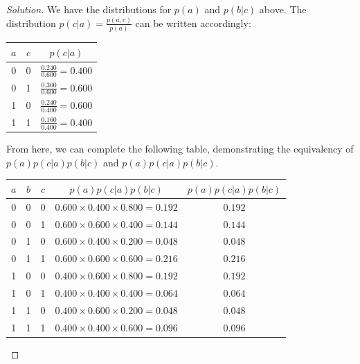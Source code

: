 \documentclass[11pt, oneside]{article}\usepackage[]{graphicx}\usepackage[]{color}
\newenvironment{solution}
  {\begin{proof}[Solution]}
  {\end{proof}}
\begin{document}
\begin{solution}\mbox{} \newline

We have the distributions for $p(a)$ and $p(b|c)$ above. The distribution $p(c|a) = \frac{p(a, c)}{p(a)}$ can be written accordingly:

\begin{table}[h]
\centering
\begin{tabular}{|c|c|c|}
\hline
$a$ & $c$ & $p(c|a)$ \\
\hline
0 & 0 & $\frac{0.240}{0.600} = 0.400$ \\
0 & 1 & $\frac{0.360}{0.600} = 0.600$ \\
1 & 0 & $\frac{0.240}{0.400} = 0.600$ \\
1 & 1 & $\frac{0.160}{0.400} = 0.400$ \\
\hline
\end{tabular}
\end{table}

From here, we can complete the following table, demonstrating the equivalency of $p(a)p(c|a)p(b|c)$ and $p(a)p(c|a)p(b|c)$.

\begin{table}[h]
\centering
\begin{tabular}{|c|c|c|c|c|}
\hline
$a$ & $b$ & $c$ & $p(a)p(c|a)p(b|c)$ & $p(a)p(c|a)p(b|c)$  \\
\hline
0 & 0 & 0 & $0.600\times0.400\times0.800=0.192$ & $0.192$  \\
0 & 0 & 1 & $0.600\times0.600\times0.400=0.144$ & $0.144$  \\
0 & 1 & 0 & $0.600\times0.400\times0.200=0.048$ & $0.048$  \\
0 & 1 & 1 & $0.600\times0.600\times0.600=0.216$ & $0.216$  \\
1 & 0 & 0 & $0.400\times0.600\times0.800=0.192$ & $0.192$  \\
1 & 0 & 1 & $0.400\times0.400\times0.400=0.064$ & $0.064$  \\
1 & 1 & 0 & $0.400\times0.600\times0.200=0.048$ & $0.048$  \\
1 & 1 & 1 & $0.400\times0.400\times0.600=0.096$ & $0.096$  \\
\hline
\end{tabular}
\end{table}

\end{solution}
\end{document}
